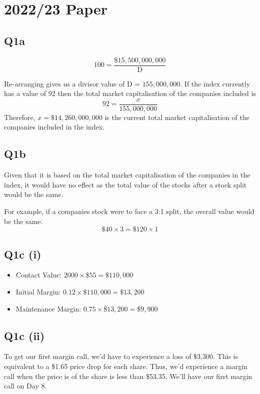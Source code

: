 \documentclass[a4paper]{article}[10pt]
\begin{document}
\newpage
\section{2022/23 Paper}
\subsection*{Q1a}

\begin{equation}
100 = \frac{\$15,500,000,000}{\text{D}}	
\end{equation}

Re-arranging gives us a divisor value of D = $155,000,000$. If the index currently has a value of 92 then the total market capitalisation of the companies included is
\begin{equation}
	92 = \frac{x}{155,000,000}
\end{equation}
Therefore, $x = \$14,260,000,000$ is the current total market capitalisation of the companies included in the index.

\subsection*{Q1b}
Given that it is based on the total market capitalisation of the companies in the index, it would have no effect as the total value of the stocks after a stock split would be the same. 

For example, if a companies stock were to face a 3:1 split, the overall value would be the same.
\begin{equation}
 \$40 \times 3 = \$120 \times 1
\end{equation}

\subsection*{Q1c (i)}
\begin{itemize}
	\item Contact Value: $2000 \times \$55 = \$110,000$
	\item Initial Margin: $0.12 \times \$110,000 = \$13,200$
	\item Maintenance Margin: $0.75 \times \$13,200 = \$9,900$
\end{itemize}

\subsection*{Q1c (ii)}
To get our first margin call, we'd have to experience a loss of \$3,300. This is equivalent to a \$1.65 price drop for each share. Thus, we'd experience a margin call when the price is of the share is less than \$53.35. We'll have our first margin call on Day 8.
\end{document}
